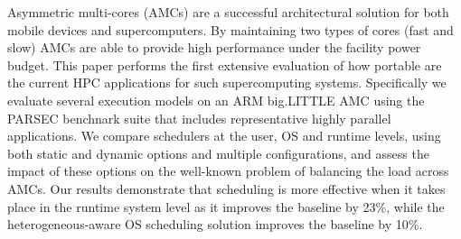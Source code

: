 Asymmetric multi-cores (AMCs) are a successful architectural solution for both mobile devices and supercomputers.
By maintaining two types of cores (fast and slow) AMCs are able to provide high performance under the facility power budget.
This paper performs the first extensive evaluation of how portable are the current HPC applications for such supercomputing systems.
Specifically we evaluate several execution models on an ARM big.LITTLE AMC using the PARSEC benchnark suite that includes representative highly parallel applications.
We compare schedulers at the user, OS and runtime levels, using both static and dynamic options and multiple configurations, and assess the impact of these options on the well-known problem of balancing the load across AMCs.
Our results demonstrate that scheduling is more effective when it takes place in the runtime system level as it improves the baseline by 23\%, while the heterogeneous-aware OS scheduling solution improves the baseline by 10\%.


%

